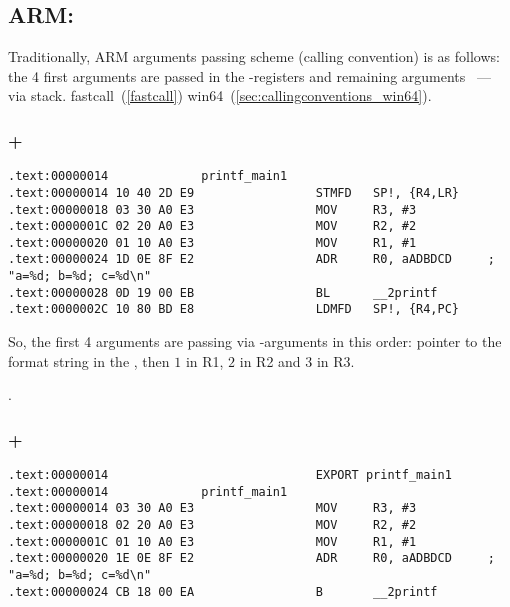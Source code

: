 ﻿\subsection{ARM: }

{Traditionally, ARM arguments passing scheme (calling convention) is as follows:
the 4 first arguments are passed in the \Rzero-\Rthree registers and remaining arguments ~--- via stack}.
fastcall~(\ref{fastcall}) \OrENRU win64~(\ref{sec:callingconventions_win64}).

\subsubsection{\NonOptimizingKeil + \ARMMode}

\begin{lstlisting}[caption=\NonOptimizingKeil + \ARMMode]
.text:00000014             printf_main1
.text:00000014 10 40 2D E9                 STMFD   SP!, {R4,LR}
.text:00000018 03 30 A0 E3                 MOV     R3, #3
.text:0000001C 02 20 A0 E3                 MOV     R2, #2
.text:00000020 01 10 A0 E3                 MOV     R1, #1
.text:00000024 1D 0E 8F E2                 ADR     R0, aADBDCD     ; "a=%d; b=%d; c=%d\n"
.text:00000028 0D 19 00 EB                 BL      __2printf
.text:0000002C 10 80 BD E8                 LDMFD   SP!, {R4,PC}
\end{lstlisting}

{So, the first 4 arguments are passing via \Rzero-\Rzero arguments in this order:
pointer to the \printf format string in the \Rzero, then $1$ in R1, $2$ in R2 and $3$ in R3}.

.

\subsubsection{\OptimizingKeil + \ARMMode}
\label{ARM_B_to_printf}

\begin{lstlisting}[caption=\OptimizingKeil + \ARMMode]
.text:00000014                             EXPORT printf_main1
.text:00000014             printf_main1
.text:00000014 03 30 A0 E3                 MOV     R3, #3
.text:00000018 02 20 A0 E3                 MOV     R2, #2
.text:0000001C 01 10 A0 E3                 MOV     R1, #1
.text:00000020 1E 0E 8F E2                 ADR     R0, aADBDCD     ; "a=%d; b=%d; c=%d\n"
.text:00000024 CB 18 00 EA                 B       __2printf
\end{lstlisting}

